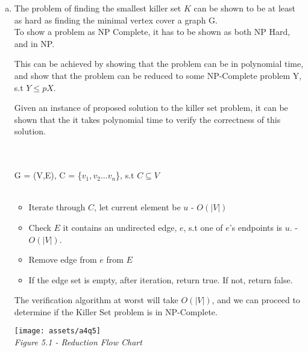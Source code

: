 \documentclass[10pt]{article}
\begin{document}
\begin{question}
    \begin{enumerate}[a)]
        \item
            The problem of finding the smallest killer set $K$ can be shown to be at least as hard as finding the minimal vertex cover a graph G. \\
            
            To show a problem as NP Complete, it has to be shown as both NP Hard, and in NP.
            
            This can be achieved by showing that the problem can be  in polynomial time, and show that the problem can be reduced to some NP-Complete problem Y, s.t $Y \leq pX$.
            
            Given an instance of proposed solution to the killer set problem, it can be shown that the it takes polynomial time to verify the correctness of this solution.
            
             \\ \\
            G = (V,E), C = \{$v_1, v_2 \dots v_n$\}, s.t $C \subseteq V$ \\ \\
         
            \begin{itemize}
                \item 
                    Iterate through $C$, let current element be $u$ - $O(|V|)$
                \item Check $E$ it contains an undirected edge, $e$, s.t one of $e$'s endpoints is $u$. - $O(|V|)$.
                \item Remove edge from $e$ from $E$
                \item If the edge set is empty, after iteration, return true. If not, return false.
            \end{itemize}
            
            The verification algorithm at worst will take $O(|V|)$, and we can proceed to determine if the Killer Set problem is in NP-Complete. \\
            
            \begin{center}
                \texttt{[image: assets/a4q5]} \\
                \textit{Figure 5.1 - Reduction Flow Chart}
            \end{center}
            

\end{enumerate}
\end{question}
\end{document}
